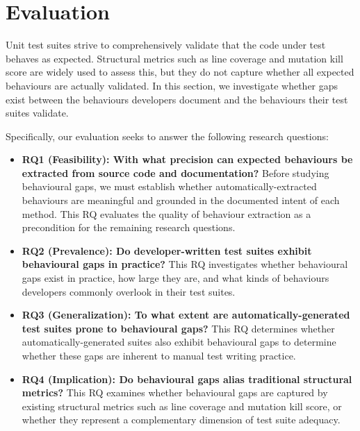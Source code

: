 


\section{Evaluation}
\label{sec:eval}


Unit test suites strive to comprehensively validate that the code under test behaves as expected. 
Structural metrics such as line coverage and mutation kill score are widely used to assess this, but they do not capture whether all expected behaviours are actually validated. 
In this section, we investigate whether gaps exist between the behaviours developers document and the behaviours their test suites validate.
%

Specifically, our evaluation seeks to answer the following research questions:

\begin{itemize}
    \item \textbf{RQ1 (Feasibility): With what precision can expected behaviours be extracted from source code and documentation?} 
     Before studying behavioural gaps, we must establish whether automatically-extracted behaviours are meaningful and grounded in the documented intent of each method. This RQ evaluates the quality of behaviour extraction as a precondition for the remaining research questions.
    
    \item \textbf{RQ2 (Prevalence): Do developer-written test suites exhibit behavioural gaps in practice?} 
     This RQ investigates whether behavioural gaps exist in practice, how large they are, and what kinds of behaviours developers commonly overlook in their test suites.
    
    \item \textbf{RQ3 (Generalization): To what extent are auto\-matically-generated test suites prone to behavioural gaps?} 
     This RQ determines whether automatically-generated suites also exhibit behavioural gaps to determine whether these gaps are inherent to manual test writing practice.
    
    \item \textbf{RQ4 (Implication): Do behavioural gaps alias traditional structural metrics?} 
     This RQ examines whether behavioural gaps are captured by existing structural metrics such as line coverage and mutation kill score, or whether they represent a complementary dimension of test suite adequacy.
\end{itemize}

